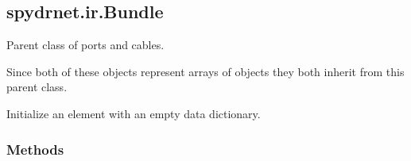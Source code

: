 \documentclass[letterpaper,10pt,english,openany,oneside]{sphinxmanual}
\begin{document}
\subsection{spydrnet.ir.Bundle}
\label{\detokenize{reference/classes/generated/spydrnet.ir.Bundle:spydrnet-ir-bundle}}\label{\detokenize{reference/classes/generated/spydrnet.ir.Bundle::doc}}

\begin{fulllineitems}
\label{\detokenize{reference/classes/generated/spydrnet.ir.Bundle:spydrnet.ir.Bundle}}
Parent class of ports and cables.

Since both of these objects represent arrays of objects they both inherit from
this parent class.

\begin{fulllineitems}
\label{\detokenize{reference/classes/generated/spydrnet.ir.Bundle:spydrnet.ir.Bundle.__init__}}
Initialize an element with an empty data dictionary.

\end{fulllineitems}

\subsubsection*{Methods}


\begin{savenotes}\sphinxatlongtablestart\begin{longtable}[c]{}
\hline

\endfirsthead

%
{}\\
\hline

\endhead

\hline
{}\\
\endfoot

\endlastfoot


\end{longtable}
\end{savenotes}
\end{fulllineitems}
\end{document}
